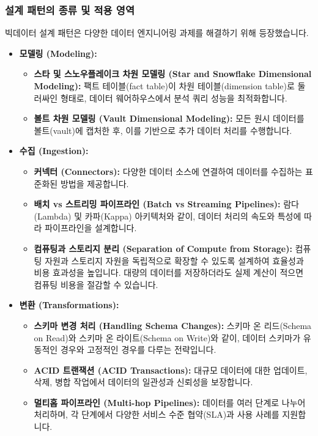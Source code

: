 \documentclass[11pt,a4paper]{article}
\theoremstyle{definition}
\begin{document}
\subsubsection{설계 패턴의 종류 및 적용 영역}
빅데이터 설계 패턴은 다양한 데이터 엔지니어링 과제를 해결하기 위해 등장했습니다.

\begin{itemize}
    \item \textbf{모델링 (Modeling):}
    \begin{itemize}
        \item \textbf{스타 및 스노우플레이크 차원 모델링 (Star and Snowflake Dimensional Modeling):} 팩트 테이블(fact table)이 차원 테이블(dimension table)로 둘러싸인 형태로, 데이터 웨어하우스에서 분석 쿼리 성능을 최적화합니다.
        \item \textbf{볼트 차원 모델링 (Vault Dimensional Modeling):} 모든 원시 데이터를 볼트(vault)에 캡처한 후, 이를 기반으로 추가 데이터 처리를 수행합니다.
    \end{itemize}
    \item \textbf{수집 (Ingestion):}
    \begin{itemize}
        \item \textbf{커넥터 (Connectors):} 다양한 데이터 소스에 연결하여 데이터를 수집하는 표준화된 방법을 제공합니다.
        \item \textbf{배치 vs 스트리밍 파이프라인 (Batch vs Streaming Pipelines):} 람다(Lambda) 및 카파(Kappa) 아키텍처와 같이, 데이터 처리의 속도와 특성에 따라 파이프라인을 설계합니다.
        \item \textbf{컴퓨팅과 스토리지 분리 (Separation of Compute from Storage):} 컴퓨팅 자원과 스토리지 자원을 독립적으로 확장할 수 있도록 설계하여 효율성과 비용 효과성을 높입니다. 대량의 데이터를 저장하더라도 실제 계산이 적으면 컴퓨팅 비용을 절감할 수 있습니다.
    \end{itemize}
    \item \textbf{변환 (Transformations):}
    \begin{itemize}
        \item \textbf{스키마 변경 처리 (Handling Schema Changes):} 스키마 온 리드(Schema on Read)와 스키마 온 라이트(Schema on Write)와 같이, 데이터 스키마가 유동적인 경우와 고정적인 경우를 다루는 전략입니다.
        \item \textbf{ACID 트랜잭션 (ACID Transactions):} 대규모 데이터에 대한 업데이트, 삭제, 병합 작업에서 데이터의 일관성과 신뢰성을 보장합니다.
        \item \textbf{멀티홉 파이프라인 (Multi-hop Pipelines):} 데이터를 여러 단계로 나누어 처리하며, 각 단계에서 다양한 서비스 수준 협약(SLA)과 사용 사례를 지원합니다.

\end{itemize}
\end{itemize}
\end{document}

